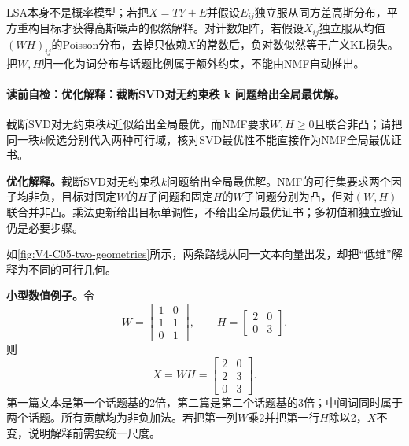 \begin{probabilitybox}
LSA本身不是概率模型；若把$X=TY+E$并假设$E_{ij}$独立服从同方差高斯分布，平方重构目标才获得高斯噪声的似然解释。对计数矩阵，若假设$X_{ij}$独立服从均值$(WH)_{ij}$的Poisson分布，去掉只依赖$X$的常数后，负对数似然等于广义KL损失。把$W,H$归一化为词分布与话题比例属于额外约束，不能由NMF自动推出。
\end{probabilitybox}

\label{struct:V4-C05-CH16}
\paragraph{读前自检：优化解释：截断SVD对无约束秩 k 问题给出全局最优解。}截断SVD对无约束秩$k$近似给出全局最优，而NMF要求$W,H\ge0$且联合非凸；请把同一秩$k$候选分别代入两种可行域，核对SVD最优性不能直接作为NMF全局最优证书。\par

\begin{optimizationbox}
\textbf{优化解释。}截断SVD对无约束秩$k$问题给出全局最优解。NMF的可行集要求两个因子均非负，目标对固定$W$的$H$子问题和固定$H$的$W$子问题分别为凸，但对$(W,H)$联合并非凸。乘法更新给出目标单调性，不给出全局最优证书；多初值和独立验证仍是必要步骤。
\end{optimizationbox}

\label{struct:V4-C05-CH17}
如\cref{fig:V4-C05-two-geometries}所示，两条路线从同一文本向量出发，却把“低维”解释为不同的可行几何。


\label{struct:V4-C05-CH18}
\textbf{小型数值例子。}令
\[
W=\begin{bmatrix}1&0\\1&1\\0&1\end{bmatrix},
\qquad
H=\begin{bmatrix}2&0\\0&3\end{bmatrix}.
\]
则
\[
X=WH=\begin{bmatrix}2&0\\2&3\\0&3\end{bmatrix}.
\]
第一篇文本是第一个话题基的2倍，第二篇是第二个话题基的3倍；中间词同时属于两个话题。所有贡献均为非负加法。若把第一列$W$乘2并把第一行$H$除以2，$X$不变，说明解释前需要统一尺度。

